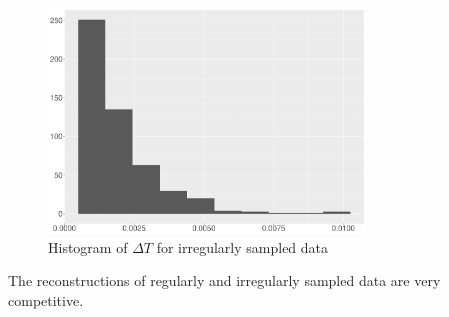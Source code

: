 \begin{figure}[!h]
    \centering
    \includegraphics[width=0.75\textwidth]{Chapters/02TractorSplineTheory/plot/ggplot/gghistIrregularTime.pdf}
 \caption{Histogram of $\Delta T$ for irregularly sampled data}\label{gghistIrregularTime}
 \end{figure}


The reconstructions of regularly and irregularly sampled data are very competitive. 

